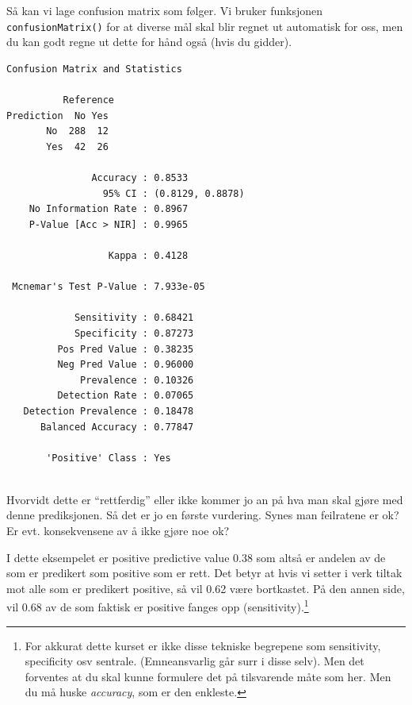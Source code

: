 \documentclass[
  letterpaper,
  DIV=11,
  numbers=noendperiod]{scrreprt}
\newenvironment{Shaded}{\begin{snugshade}}{\end{snugshade}}
\newcommand{\AttributeTok}[1]{\textcolor[rgb]{0.40,0.45,0.13}{#1}}
\newcommand{\FunctionTok}[1]{\textcolor[rgb]{0.28,0.35,0.67}{#1}}
\newcommand{\NormalTok}[1]{\textcolor[rgb]{0.00,0.23,0.31}{#1}}
\newcommand{\OtherTok}[1]{\textcolor[rgb]{0.00,0.23,0.31}{#1}}
\newcommand{\SpecialCharTok}[1]{\textcolor[rgb]{0.37,0.37,0.37}{#1}}
\newcommand{\StringTok}[1]{\textcolor[rgb]{0.13,0.47,0.30}{#1}}
\begin{document}
Så kan vi lage confusion matrix som følger. Vi bruker funksjonen
\texttt{confusionMatrix()} for at diverse mål skal blir regnet ut
automatisk for oss, men du kan godt regne ut dette for hånd også (hvis
du gidder).

\begin{Shaded}
\end{Shaded}

\begin{verbatim}
Confusion Matrix and Statistics

          Reference
Prediction  No Yes
       No  288  12
       Yes  42  26
                                          
               Accuracy : 0.8533          
                 95% CI : (0.8129, 0.8878)
    No Information Rate : 0.8967          
    P-Value [Acc > NIR] : 0.9965          
                                          
                  Kappa : 0.4128          
                                          
 Mcnemar's Test P-Value : 7.933e-05       
                                          
            Sensitivity : 0.68421         
            Specificity : 0.87273         
         Pos Pred Value : 0.38235         
         Neg Pred Value : 0.96000         
             Prevalence : 0.10326         
         Detection Rate : 0.07065         
   Detection Prevalence : 0.18478         
      Balanced Accuracy : 0.77847         
                                          
       'Positive' Class : Yes             
                                          
\end{verbatim}

Hvorvidt dette er ``rettferdig'' eller ikke kommer jo an på hva man skal
gjøre med denne prediksjonen. Så det er jo en første vurdering. Synes
man feilratene er ok? Er evt. konsekvensene av å ikke gjøre noe ok?

I dette eksempelet er positive predictive value 0.38 som altså er
andelen av de som er predikert som positive som er rett. Det betyr at
hvis vi setter i verk tiltak mot alle som er predikert positive, så vil
0.62 være bortkastet. På den annen side, vil 0.68 av de som faktisk er
positive fanges opp (sensitivity).\footnote{For akkurat dette kurset er
  ikke disse tekniske begrepene som sensitivity, specificity osv
  sentrale. (Emneansvarlig går surr i disse selv). Men det forventes at
  du skal kunne formulere det på tilsvarende måte som her. Men du må
  huske \emph{accuracy}, som er den enkleste.}
\end{document}
